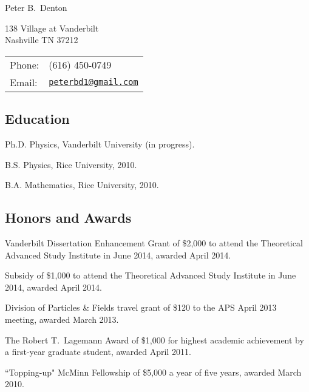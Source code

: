 \documentclass[letterpaper]{article}
\def\name{Peter B.~Denton}
\renewenvironment{itemize}{
\begin{list}{}{
\setlength{\leftmargin}{1.5em}
}
}{
\end{list}
}
\begin{document}
{\huge \name}


\vspace{0.1in}

\begin{minipage}{0.45\linewidth}
138 Village at Vanderbilt\\
Nashville TN 37212
\end{minipage}
\begin{minipage}{0.45\linewidth}
\begin{tabular}{ll}
Phone: & (616) 450-0749\\
Email: & \href{mailto:peterbd1@gmail.com}{\tt peterbd1@gmail.com} \\
\end{tabular}
\end{minipage}
\subsection*{Education}
\begin{itemize}
\item Ph.D. Physics, Vanderbilt University (in progress).
\item B.S. Physics, Rice University, 2010.
\item B.A. Mathematics, Rice University, 2010.
\end{itemize}
\subsection*{Honors and Awards}
\begin{itemize}
\item Vanderbilt Dissertation Enhancement Grant of \$2,000 to attend the Theoretical Advanced Study Institute in
June 2014, awarded April 2014.
\item Subsidy of \$1,000 to attend the Theoretical Advanced Study Institute in June 2014, awarded April 2014.
\item Division of Particles \& Fields travel grant of \$120 to the APS April 2013 meeting, awarded March 2013.
\item The Robert T.~Lagemann Award of \$1,000 for highest academic achievement by a first-year graduate student, awarded April 2011.
\item ``Topping-up" McMinn Fellowship of \$5,000 a year of five years, awarded March 2010.
\end{itemize}
\end{document}
